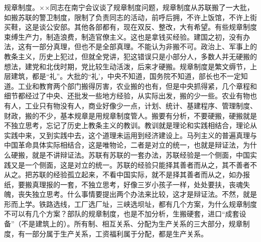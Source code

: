 规章制度。××同志在南宁会议谈了规章制度问题，规章制度从苏联搬了一大批，如搬苏联的警卫制度，限制了负责同志的活动，前呼后拥，不许上饭馆，不许上街买鞋，这是谈公安部。其他各部都有，现在双反、整改，大有希望。有些规章制度束缚生产力，制造浪费，制造官僚主义。这也是拿钱买经验。建国之初，没有办法，这有一部分真理，但也不是全部真理。不能认为非搬不可。政治上、军事上的教条主义，历史上犯过，但就全党讲，犯这错误只是小部分人，多数人并无硬搬的想法，建党和北伐时期，党比较生动活泼，后来才硬搬。规章制度是繁文缛节，上层建筑，都是“礼”。大批的“礼’，中央不知道，国务院不知道，部长也不一定知道。工业和教育两个部门搬得厉害，农业搬的也有，但是中央抓得紧，几个章程和细节都经过了中央、还批发一些地方经验，从实际出发，搬的少一些。农业有物也有人，工业只有物没有人，商业好像少一点，计划、统计、基建程序、管理制度、财政，搬的不少，基本规章是用规章制度管人。搬要有分析，不要硬搬，硬搬就是不独立思考，忘记了历史上教条主义的教训。教训就是理论和实践相结合，理论从实践中来，又到实践中去，这个道理未运用到经济建设上。马列主义的普遍真理与中国革命具体实际相结合，这是唯物论，二者是对立的统一，也就是辩证法，为什么硬搬，就是不讲辩证法。苏联有苏联的一套办法，苏联经验是一个侧面，中国实践又是一个侧面，这是对立的统一。苏联的经验只能择其善者而从之，其不善者不从之。把苏联的经验孤立起来，不看中国实际，就不是择其善者而从之，如办报纸，要搬真理报的一套，不独立思考，好像三岁小孩子一样，处处要扶，丧魂失魄，丧失独立思考。什么事情要提出两个办法来比较，这才是辩证法。不然，就是形而上学。铁路选线，工厂选厂址，三峡选坝址，都有几个方案，为什么规章制度不可以有几个方案？部队的规章制度，也是不加分析，生搬硬套，进口“成套设备”（不是建筑上的）。所有制、相互关系、分配为生产关系的三大部分，规章制度，有一部分属于生产关系，工资福利属于分配，都是生产关系。

